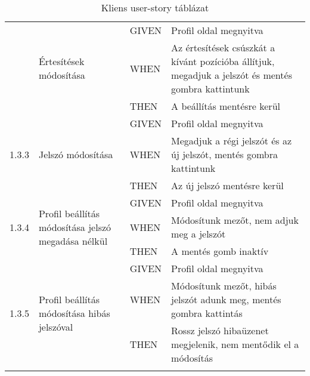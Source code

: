 \begin{center}
\begin{longtable}{ | p{} | p{} | p{} | p{} | }
			\pagebreak

			\multirow{3}{*}{1.3.2} 
			& \multirow{3}{=}{Értesítések módosítása} 
			& GIVEN 
			& Profil oldal megnyitva \\
			\cline{3-4}
			& & WHEN 
			& Az értesítések csúszkát a kívánt pozícióba állítjuk, megadjuk a jelszót és mentés gombra kattintunk \\
			\cline{3-4}
			& & THEN 
			& A beállítás mentésre kerül \\
			\hline

			\multirow{3}{*}{1.3.3} 
			& \multirow{3}{=}{Jelszó módosítása} 
			& GIVEN 
			& Profil oldal megnyitva \\
			\cline{3-4}
			& & WHEN 
			& Megadjuk a régi jelszót és az új jelszót, mentés gombra kattintunk \\
			\cline{3-4}
			& & THEN 
			& Az új jelszó mentésre kerül \\
			\hline

			\multirow{3}{*}{1.3.4} 
			& \multirow{3}{=}{Profil beállítás módosítása jelszó megadása nélkül} 
			& GIVEN 
			& Profil oldal megnyitva \\
			\cline{3-4}
			& & WHEN 
			& Módosítunk mezőt, nem adjuk meg a jelszót \\
			\cline{3-4}
			& & THEN 
			& A mentés gomb inaktív
			
			\\
			\hline

			\multirow{3}{*}{1.3.5} 
			& \multirow{3}{=}{Profil beállítás módosítása hibás jelszóval} 
			& GIVEN 
			& Profil oldal megnyitva \\
			\cline{3-4}
			& & WHEN 
			& Módosítunk mezőt, hibás jelszót adunk meg, mentés gombra kattintás \\
			\cline{3-4}
			& & THEN 
			& Rossz jelszó hibaüzenet megjelenik, nem mentődik el a módosítás \\
			\hline

			\caption{Kliens user-story táblázat}
			\label{tab:userstoryclient}       
	\end{longtable}
\end{center}


\pagebreak


